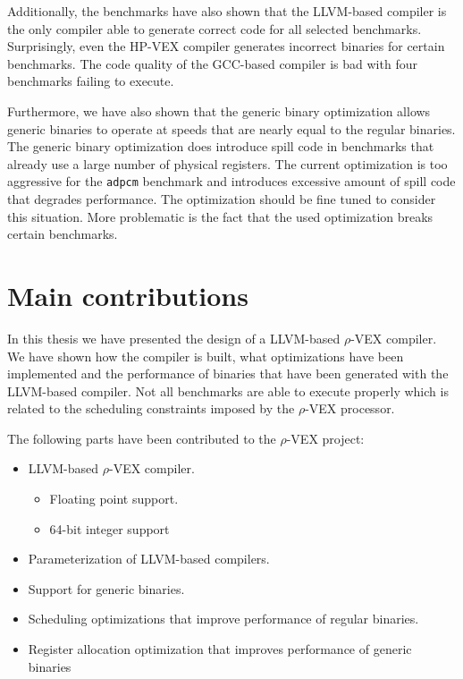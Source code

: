Additionally, the benchmarks have also shown that the LLVM-based compiler is the only compiler able to generate correct code for all selected benchmarks. Surprisingly, even the HP-VEX compiler generates incorrect binaries for certain benchmarks. The code quality of the GCC-based compiler is bad with four benchmarks failing to execute.

Furthermore, we have also shown that the generic binary optimization allows generic binaries to operate at speeds that are nearly equal to the regular binaries. The generic binary optimization does introduce spill code in benchmarks that already use a large number of physical registers. The current optimization is too aggressive for the \texttt{adpcm} benchmark and introduces excessive amount of spill code that degrades performance. The optimization should be fine tuned to consider this situation. More problematic is the fact that the used optimization breaks certain benchmarks.

\section{Main contributions}
In this thesis we have presented the design of a LLVM-based $\rho$-VEX compiler. We have shown how the compiler is built, what optimizations have been implemented and the performance of binaries that have been generated with the LLVM-based compiler. Not all benchmarks are able to execute properly which is related to the scheduling constraints imposed by the $\rho$-VEX processor.

The following parts have been contributed to the $\rho$-VEX project:

\begin{itemize}
	\item LLVM-based $\rho$-VEX compiler.
	\begin{itemize}
		\item Floating point support.
		\item 64-bit integer support
	\end{itemize}
	\item Parameterization of LLVM-based compilers.
	\item Support for generic binaries.
	\item Scheduling optimizations that improve performance of regular binaries.
	\item Register allocation optimization that improves performance of generic binaries
\end{itemize}

